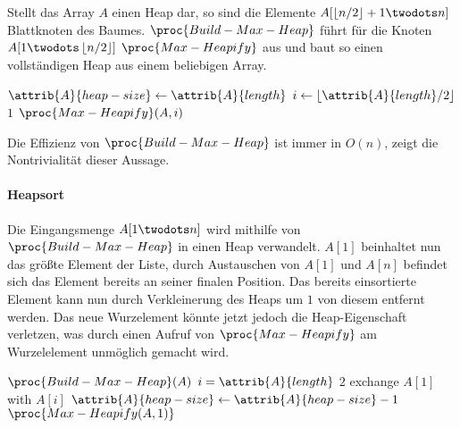 Stellt das Array $A$ einen Heap dar, so sind die Elemente $A[\floor{n / 2} + 1 \twodots n]$ Blattknoten des Baumes\footnotemark. $\proc{Build-Max-Heap}$ führt für die Knoten $A[1 \twodots \floor{n / 2}]$ $\proc{Max-Heapify}$ aus und baut so einen vollständigen Heap aus einem beliebigen Array.


\begin{codebox}
    \li $\attrib{A}{heap-size} \gets \attrib{A}{length}$
    \li \For $i \gets \lfloor \attrib{A}{length}/2 \rfloor$ \Downto $1$
    \li     \Do
                $\proc{Max-Heapify}(A, i)$
            \End
\end{codebox}

Die Effizienz von $\proc{Build-Max-Heap}$ ist immer in $O(n)$, \cite[155]{taocp3} zeigt die Nontrivialität dieser Aussage.

\paragraph{Heapsort}

Die Eingangsmenge $A[1 \twodots n]$ wird mithilfe von $\proc{Build-Max-Heap}$ in einen Heap verwandelt. $A[1]$ beinhaltet nun das größte Element der Liste, durch Austauschen von $A[1]$ und $A[n]$ befindet sich das Element bereits an seiner finalen Position. Das bereits einsortierte Element kann nun durch Verkleinerung des Heaps um $1$ von diesem entfernt werden. Das neue Wurzelement könnte jetzt jedoch die Heap-Eigenschaft verletzen, was durch einen Aufruf von $\proc{Max-Heapify}$ am Wurzelelement unmöglich gemacht wird.

\begin{codebox}
    \li $\proc{Build-Max-Heap}(A)$
    \li \For $i = \attrib{A}{length}$ \Downto $2$
    \li     \Do
                exchange $A[1]$ with $A[i]$
    \li         $\attrib{A}{heap-size} \gets \attrib{A}{heap-size} - 1$
    \li         $\proc{Max-Heapify(A, 1)}$
            \End
\end{codebox}

